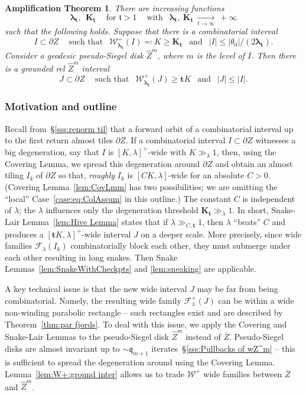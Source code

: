 \documentclass{amsart}
\renewcommand{\sp}{{\ \ }}
\newcommand{\1}{{\mathbb 1 }}
\newcommand{\blambda}{{\boldsymbol\lambda}}
\newcommand{\Fam}{{\mathcal F}}
\newcommand{\Width}{{\mathcal W}}
\newcommand{\wZ}{{\widehat Z}}
\newcommand{\bK}{{\mathbf K}}
\newcommand{\bbt}{{\mathbf t}}
\newcommand{\qq}{\mathfrak{q}}
\renewcommand{\tt}{\mathfrak{t}}
\newtheorem{ampthm}[thm]{Amplification Theorem}
\theoremstyle{remark}
\numberwithin{equation}{section}
\theoremstyle{definition}
\begin{document}
\begin{ampthm}
\label{thm:SpreadingAround}
There are increasing functions \[\blambda_\bbt,\sp  \bK_\bbt \sp\sp \text{ for }\tt>1\sp\sp\text{ with }\sp \blambda_\bbt,  \ \bK_\bbt\ \underset{t\to \infty}\longrightarrow \ +\infty \] such that the following holds. Suppose that there is a combinatorial interval
\[ I\subset \partial Z\sp\sp \text{ such that }\sp  \Width^+_{\blambda_\bbt}(I) \eqqcolon K \ge \bK_\bbt \sp \text{ and }\sp |I|\le |\theta_0|/(2\blambda_\bbt). 
\]
Consider a geodesic pseudo-Siegel disk $\wZ^m$, where $m$ is the level of $I$.  Then there is a grounded rel $\wZ^m$ interval \[J\subset \partial Z \sp\sp \text{ such that } \sp \Width^+_{\blambda_\bbt} (J) \ge \bbt K \sp \text{ and }\sp |J|\le |I|.
\]
\end{ampthm}
\subsubsection{Motivation and outline} \label{sss:outline of CovL LairL} Recall from~\S\ref{sss:renorm til} that a forward orbit of a combinatorial interval up to the first return almost tiles $\partial Z$. If a combinatorial interval $I\subset \partial Z$ witnesses a big degeneration, say that $I$ is $[K,\lambda]^+$-wide with $K\gg_{\lambda}1$, then, using the Covering Lemma, we spread this degeneration around $\partial Z$ and obtain an almost tiling $I_k$ of $\partial Z$ so that, \emph{roughly} $I_k$ is $[C K, \lambda]$-wide for an absolute $C>0$. (Covering Lemma~\ref{lem:CovLmm} has two possibilities; we are omitting the ``local'' Case~\eqref{case:eq:ColAssum} in this outline.)  The constant $C$ is independent of $\lambda$; the $\lambda$ influences only the degeneration threshold $\bK_{\bbt}\gg_\lambda 1$. In short, Snake-Lair Lemma~\ref{lem:Hive Lemma} states that if $\lambda\gg _{C, \bbt} 1$, then $\lambda$ ``beats'' $C$ and produces a $[\bbt K, \lambda]^+$-wide interval $J$ on a deeper scale. More precisely, since wide families $\Fam_\lambda(I_k)$ combinatorially block each other, they must submerge under each other resulting in long snakes. Then Snake Lemmas~\ref{lem:SnakeWithCheckpts} and \ref{lem:sneaking} are applicable. 


A key technical issue is that the new wide interval $J$ may be far from being combinatorial. Namely, the resulting wide family $\Fam^+_\lambda(J)$ can be within a wide non-winding parabolic rectangle -- such rectangles exist and are described by Theorem~\ref{thm:par fjords}. To deal with this issue, we apply the Covering and Snake-Lair Lemmas to the pseudo-Siegel disk $\wZ^m$ instead of $\overline Z$. Pseudo-Siegel disks are almost invariant up to $\sim \qq_{m+1}$ iterates~\S\ref{sss:Pullbacks of wZ^m} -- this is sufficient to spread the degeneration around using the Covering Lemma. Lemma~\ref{lem:W+:ground inter} allows us to trade $\Width^+$ wide families between $\overline Z$ and $\wZ^m$. 
\end{document}
